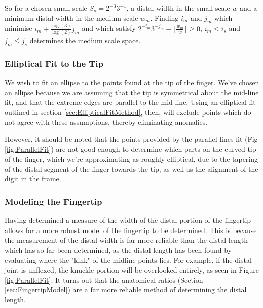 So for a chosen small scale $S_s = 2^{-3} 3^{-1}$, a distal width in the small scale $w$ and a minimum distal width in the medium scale $w_m$. 
Finding  $i_m$ and $j_m$ which minimise $i_m + \frac{\log(3)}{\log(2)} j_m$  and which satisfy  $2^{-i_m} 3^{-j_m} - \lceil \frac{w_m}{w} \rceil \ge 0$, $i_m\le i_s$ and $j_m \le j_s$ determines the medium scale space.

\subsubsection{Elliptical Fit to the Tip}\label{sec:EllipticalFitToTheTip}

We wish to fit an ellipse to the points found at the tip of the finger. We've chosen an ellipse because we are assuming that the tip is symmetrical about the mid-line fit, and that the extreme edges are parallel to the mid-line. Using an elliptical fit outlined in section \ref{sec:EllipticalFitMethod}, then, will exclude points which do not agree with these assumptions, thereby eliminating anomalies.

However, it should be noted that the points provided by the parallel lines fit (Fig \ref{fig:ParallelFit}) are not good enough to determine which parts on the curved tip of the finger, which we're approximating as roughly elliptical, due to the tapering of the distal segment of the finger towards the tip, as well as the alignment of the digit in the frame.

\subsubsection{Modeling the Fingertip}\label{sec:ModellingTheFingertip}
Having determined a measure of the width of the distal portion of the fingertip allows for a more robust model of the fingertip to be determined. This is because the measurement of the distal width is far more reliable than the distal length which has so far been determined, as the distal length has been found by evaluating where the "kink" of the midline points lies. For example, if the distal joint is unflexed, the knuckle portion will be overlooked entirely, as seen in Figure \ref{fig:ParallelFit}. It turns out that the anatomical ratios (Section \ref{sec:FingertipModel}) are a far more reliable method of determining the distal length.

